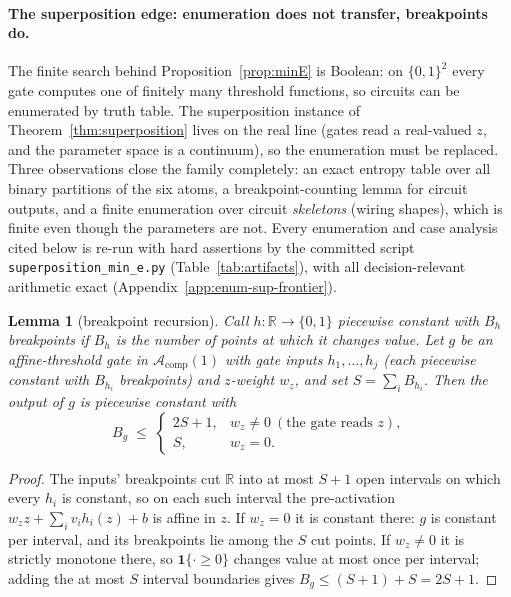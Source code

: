 \documentclass[twocolumn,10pt]{article}
\newtheorem{lemma}[theorem]{Lemma}
\theoremstyle{definition}
\theoremstyle{remark}
\newcommand{\R}{\mathbb{R}}
\newcommand{\cA}{\mathcal{A}}
\begin{document}
\paragraph{The superposition edge: enumeration does not transfer,
breakpoints do.} The finite search behind Proposition~\ref{prop:minE}
is Boolean: on $\{0,1\}^2$ every gate computes one of finitely many
threshold functions, so circuits can be enumerated by truth table. The
superposition instance of Theorem~\ref{thm:superposition} lives on the
real line (gates read a real-valued $z$, and the parameter space is
a continuum), so the enumeration must be replaced. Three observations
close the family completely: an exact entropy table over all binary
partitions of the six atoms, a breakpoint-counting lemma for circuit
outputs, and a finite enumeration over circuit \emph{skeletons} (wiring
shapes), which is finite even though the parameters are not. Every
enumeration and case analysis cited below is re-run with hard
assertions by the committed script
\texttt{superposition\_min\_e.py} (Table~\ref{tab:artifacts}), with all
decision-relevant arithmetic exact
(Appendix~\ref{app:enum-sup-frontier}).

\begin{lemma}[breakpoint recursion]
\label{lem:breakpoint}
Call $h : \R \to \{0,1\}$ \emph{piecewise constant with $B_h$
breakpoints} if $B_h$ is the number of points at which it changes
value. Let $g$ be an affine-threshold gate in $\cA_{\mathrm{comp}}(1)$
with gate inputs $h_1, \dots, h_j$ (each piecewise constant with
$B_{h_i}$ breakpoints) and $z$-weight $w_z$, and set
$S = \sum_i B_{h_i}$. Then the output of $g$ is piecewise constant with
\[
B_g \;\le\;
\begin{cases}
2S + 1, & w_z \neq 0 \ (\text{the gate reads } z),\\[2pt]
S, & w_z = 0.
\end{cases}
\]
\end{lemma}

\begin{proof}
The inputs' breakpoints cut $\R$ into at most $S + 1$ open intervals on
which every $h_i$ is constant, so on each such interval the
pre-activation $w_z z + \sum_i v_i h_i(z) + b$ is affine in $z$. If
$w_z = 0$ it is constant there: $g$ is constant per interval, and its
breakpoints lie among the $S$ cut points. If $w_z \neq 0$ it is
strictly monotone there, so $\mathbf 1\{\cdot \ge 0\}$ changes value at
most once per interval; adding the at most $S$ interval boundaries
gives $B_g \le (S + 1) + S = 2S + 1$.
\end{proof}
\end{document}
